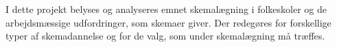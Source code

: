 I dette projekt belyses og analyseres emnet skemalægning i folkeskoler og de arbejdsmæssige udfordringer, som skemaer giver. Der redegøres for forskellige typer af skemadannelse og for de valg, som under skemalægning må træffes.